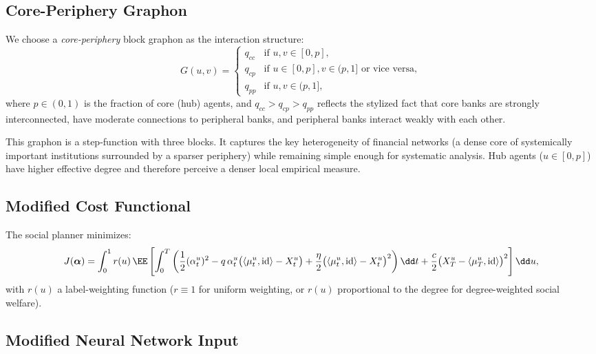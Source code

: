 \documentclass[11pt]{article}
\begin{document}
\subsection{Core-Periphery Graphon}

We choose a \emph{core-periphery} block graphon as the interaction structure:
\begin{equation}\label{eq:core-periphery}
  G(u,v) = \begin{cases}
    q_{cc} & \text{if } u,v \in [0, p], \\
    q_{cp} & \text{if } u \in [0,p], v \in (p,1] \text{ or vice versa}, \\
    q_{pp} & \text{if } u,v \in (p, 1],
  \end{cases}
\end{equation}
where $p \in (0,1)$ is the fraction of core (hub) agents, and $q_{cc} > q_{cp} > q_{pp}$ reflects the stylized fact that core banks are strongly interconnected, have moderate connections to peripheral banks, and peripheral banks interact weakly with each other.

\begin{remark}
  This graphon is a step-function with three blocks. It captures the key heterogeneity of financial networks (a dense core of systemically important institutions surrounded by a sparser periphery) while remaining simple enough for systematic analysis. Hub agents ($u \in [0,p]$) have higher effective degree and therefore perceive a denser local empirical measure.
\end{remark}

\subsection{Modified Cost Functional}

The social planner minimizes:
\begin{equation}\label{eq:hetero-cost}
  J(\boldsymbol{\alpha}) = \int_0^1 r(u)\,\EE\left[\int_0^T \left(\frac{1}{2}(\alpha_t^u)^2 - q\,\alpha_t^u\big(\langle \mu_t^u, \mathrm{id}\rangle - X_t^u\big) + \frac{\eta}{2}\big(\langle \mu_t^u, \mathrm{id}\rangle - X_t^u\big)^2\right)\dd t + \frac{c}{2}\big(X_T^u - \langle \mu_T^u, \mathrm{id}\rangle\big)^2\right]\dd u,
\end{equation}
with $r(u)$ a label-weighting function (\eg $r \equiv 1$ for uniform weighting, or $r(u)$ proportional to the degree for degree-weighted social welfare).

\subsection{Modified Neural Network Input}
\end{document}
